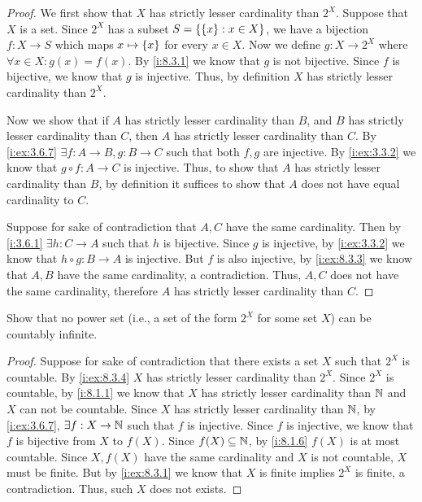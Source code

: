 \begin{proof}
  We first show that \(X\) has strictly lesser cardinality than \(2^X\).
  Suppose that \(X\) is a set.
  Since \(2^X\) has a subset \(S = \left\lbrace\left\lbrace x\right\rbrace : x \in X\right\rbrace\), we have a bijection \(f : X \to S\) which maps \(x \mapsto \left\lbrace x\right\rbrace\) for every \(x \in X\).
  Now we define \(g : X \to 2^X\) where \(\forall x \in X : g(x) = f(x)\).
  By \cref{i:8.3.1} we know that \(g\) is not bijective.
  Since \(f\) is bijective, we know that \(g\) is injective.
  Thus, by definition \(X\) has strictly lesser cardinality than \(2^X\).

  Now we show that if \(A\) has strictly lesser cardinality than \(B\), and \(B\) has strictly lesser cardinality than \(C\), then \(A\) has strictly lesser cardinality than \(C\).
  By \cref{i:ex:3.6.7} \(\exists f : A \to B, g : B \to C\) such that both \(f, g\) are injective.
  By \cref{i:ex:3.3.2} we know that \(g \circ f : A \to C\) is injective.
  Thus, to show that \(A\) has strictly lesser cardinality than \(B\), by definition it suffices to show that \(A\) does not have equal cardinality to \(C\).

  Suppose for sake of contradiction that \(A, C\) have the same cardinality.
  Then by \cref{i:3.6.1} \(\exists h : C \to A\) such that \(h\) is bijective.
  Since \(g\) is injective, by \cref{i:ex:3.3.2} we know that \(h \circ g : B \to A\) is injective.
  But \(f\) is also injective, by \cref{i:ex:8.3.3} we know that \(A, B\) have the same cardinality, a contradiction.
  Thus, \(A, C\) does not have the same cardinality, therefore \(A\) has strictly lesser cardinality than \(C\).
\end{proof}

\begin{ex}\label{i:ex:8.3.5}
  Show that no power set (i.e., a set of the form \(2^X\) for some set \(X\)) can be countably infinite.
\end{ex}

\begin{proof}
  Suppose for sake of contradiction that there exists a set \(X\) such that \(2^X\) is countable.
  By \cref{i:ex:8.3.4} \(X\) has strictly lesser cardinality than \(2^X\).
  Since \(2^X\) is countable, by \cref{i:8.1.1} we know that \(X\) has strictly lesser cardinality than \(\mathbb{N}\) and \(X\) can not be countable.
  Since \(X\) has strictly lesser cardinality than \(\mathbb{N}\), by \cref{i:ex:3.6.7}, \(\exists f : X \to \mathbb{N}\) such that \(f\) is injective.
  Since \(f\) is injective, we know that \(f\) is bijective from \(X\) to \(f(X)\).
  Since \(f(X) \subseteq \mathbb{N}\), by \cref{i:8.1.6} \(f(X)\) is at most countable.
  Since \(X, f(X)\) have the same cardinality and \(X\) is not countable, \(X\) must be finite.
  But by \cref{i:ex:8.3.1} we know that \(X\) is finite implies \(2^X\) is finite, a contradiction.
  Thus, such \(X\) does not exists.
\end{proof}
